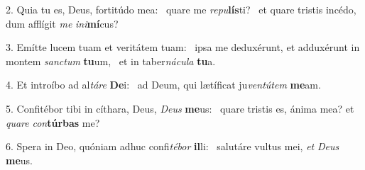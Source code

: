 2. Quia tu es, Deus, fortitúdo mea: \dag\  quare me \textit{re}\textit{pu}\textbf{lís}ti? \ast\  et quare tristis incédo, dum afflígit \textit{me} \textit{in}\textit{i}\textbf{mí}cus?\

3. Emítte lucem tuam et veritátem tuam: \dag\  ipsa me deduxérunt, et adduxérunt in montem \textit{sanc}\textit{tum} \textbf{tu}um, \ast\  et in taber\textit{ná}\textit{cu}\textit{la} \textbf{tu}a.\

4. Et introíbo ad al\textit{tá}\textit{re} \textbf{De}i: \ast\  ad Deum, qui lætíficat ju\textit{ven}\textit{tú}\textit{tem} \textbf{me}am.\

5. Confitébor tibi in cíthara, Deus, \textit{De}\textit{us} \textbf{me}us: \ast\  quare tristis es, ánima mea? et \textit{qua}\textit{re} \textit{con}\textbf{túr}\textbf{bas} me?\

6. Spera in Deo, quóniam adhuc confi\textit{té}\textit{bor} \textbf{il}li: \ast\  salutáre vultus mei, \textit{et} \textit{De}\textit{us} \textbf{me}us.\


